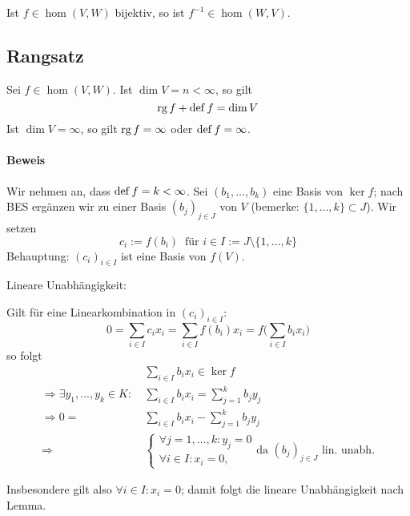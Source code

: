 	Ist $ f\in \hom (V,W) $ bijektiv, so ist $ f^{-1}\in \hom (W,V) $.

\subsection{Rangsatz}
	\begin{Satz}[Rangsatz]
		Sei $ f\in \hom (V,W) $. Ist $ \dim V = n < \infty $,  so gilt
                    \[\operatorname{rg} f + \operatorname{def} f = \dim V\]
                Ist $ \dim V = \infty $, so gilt $ \operatorname{rg} f = \infty $ oder $ \operatorname{def} f = \infty $.
	\end{Satz}

\paragraph{Beweis}
	Wir nehmen an, dass $ \operatorname{def} f = k < \infty $.
	Sei $ (b_1,...,b_k) $ eine Basis von $ \ker f $;
	nach BES ergänzen wir zu einer Basis $ (b_j)_{j\in J} $ von $ V $ (bemerke: $ \{1,...,k\}\subset J $).
	Wir setzen 
	\[ c_i:=f(b_i)\ \text{ für } i\in I:=J\setminus \{1,...,k\} \]
	Behauptung: $(c_i)_{i\in I}$ ist eine Basis von $f(V)$.
	
        Lineare Unabhängigkeit:
        \begin{addmargin}[25pt]{0pt}
	Gilt für eine Linearkombination in $(c_i)_{i\in I}$:
		\[ 0=\sum_{i\in I}c_ix_i = \sum_{i\in I}f(b_i)x_i = f\Big(\sum_{i\in I}b_ix_i\Big)
		 \]
	so folgt
	\begin{align*}
		&\sum_{i\in I}b_ix_i \in \ker f\\
		\Rightarrow \exists y_1,...,y_k\in K:\ &\sum_{i\in I}b_ix_i=\sum_{j=1}^{k}b_jy_j\\
		\Rightarrow 0 = &\sum_{i\in I}b_ix_i - \sum_{j=1}^{k}b_jy_j\\
		\Rightarrow&
		\begin{cases}
			\forall j = 1, ... ,k:y_j=0\\
			\forall i\in I: x_i = 0,
		\end{cases}
		\text{da $(b_j)_{j\in J}$ lin. unabh.}
	\end{align*}
			
	Insbesondere gilt also $\forall i\in I: x_i = 0$; damit folgt die lineare Unabhängigkeit nach Lemma.
	\end{addmargin}

